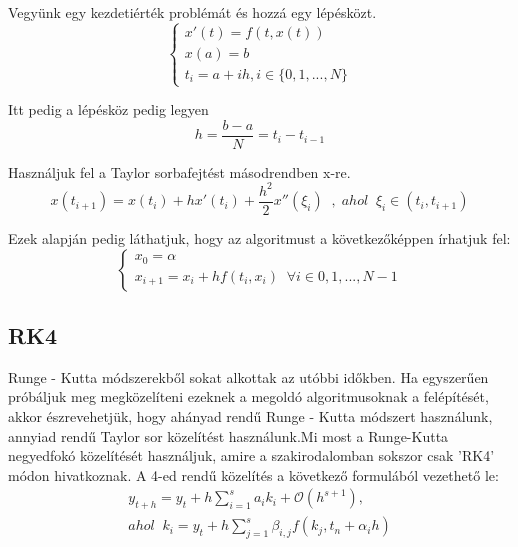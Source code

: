 \documentclass{article}
\theoremstyle{definition}
\theoremstyle{theorem}
\begin{document}
Vegyünk egy kezdetiérték problémát és hozzá egy lépésközt.
\begin{equation*}
    \begin{cases}
       x'(t) = f(t,x(t))\\
       x(a) = b \\
       t_i = a + ih , i \in \{0,1,...,N\}
    \end{cases}
\end{equation*}

Itt pedig a lépésköz pedig legyen \[h = \frac{b-a}{N} = t_i - t_{i-1} \]

Használjuk fel a Taylor sorbafejtést másodrendben x-re.
\begin{equation*}
    x(t_{i+1}) = x(t_i) + h x'(t_i) + \frac{h^2}{2} x''(\xi_i) \;\;,\;ahol \;\;\xi _i \in (t_i, t_{i+1})
\end{equation*}

Ezek alapján pedig láthatjuk, hogy az algoritmust a következőképpen írhatjuk fel:
\begin{equation*}
    \begin{cases}
        x_0 = \alpha \\
        x_{i+1} = x_i + h f(t_i,x_i) \;\;\forall i \in{0,1,...,N-1}
    \end{cases}
\end{equation*}
\subsection{RK4}
Runge - Kutta módszerekből sokat alkottak az utóbbi időkben. Ha egyszerűen próbáljuk meg megközelíteni ezeknek a megoldó algoritmusoknak a felépítését, akkor észrevehetjük, hogy ahányad rendű Runge - Kutta módszert használunk, annyiad rendű Taylor sor közelítést használunk.Mi most a Runge-Kutta negyedfokó közelítését használjuk, amire a szakirodalomban sokszor csak 'RK4' módon hivatkoznak. A 4-ed rendű közelítés a következő formulából vezethető le:
\begin{equation*}
\begin{split}
      y_{t+h} = y_t + h \sum_{i=1}^{s} a_i k_i + \mathcal{O}(h^{s+1}),\\
      ahol\;\;k_i = y_t + h \sum_{j=1}^{s} \beta_{i,j} f(k_j,t_n + \alpha_ih)
\end{split}
\end{equation*}
\end{document}
